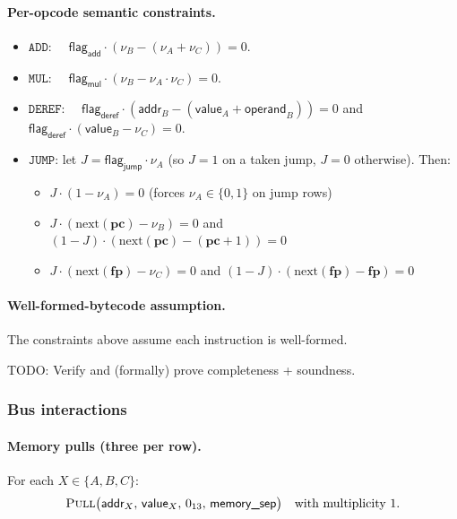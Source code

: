 \documentclass{article}
\theoremstyle{definition}
\begin{document}
\paragraph{Per-opcode semantic constraints.}
\begin{itemize}
    \item $\texttt{ADD}$: $\quad \textsf{flag}_\textsf{add} \cdot (\nu_B - (\nu_A + \nu_C)) = 0$.
    \item $\texttt{MUL}$: $\quad \textsf{flag}_\textsf{mul} \cdot (\nu_B - \nu_A \cdot \nu_C) = 0$.
    \item $\texttt{DEREF}$: $\quad \textsf{flag}_\textsf{deref} \cdot (\textsf{addr}_B - (\textsf{value}_A + \textsf{operand}_B)) = 0$ \quad and \quad $\textsf{flag}_\textsf{deref} \cdot (\textsf{value}_B - \nu_C) = 0$.
    \item $\texttt{JUMP}$: let $J = \textsf{flag}_\textsf{jump} \cdot \nu_A$ (so $J = 1$ on a taken jump, $J = 0$ otherwise). Then:
    \begin{itemize}
        \item $J \cdot (1 - \nu_A) = 0$ \quad (forces $\nu_A \in \{0, 1\}$ on jump rows)
        \item $J \cdot (\text{next}(\textbf{pc}) - \nu_B) = 0$ \quad and \quad $(1 - J) \cdot (\text{next}(\textbf{pc}) - (\textbf{pc} + 1)) = 0$
        \item $J \cdot (\text{next}(\textbf{fp}) - \nu_C) = 0$ \quad and \quad $(1 - J) \cdot (\text{next}(\textbf{fp}) - \textbf{fp}) = 0$
    \end{itemize}
\end{itemize}

\paragraph{Well-formed-bytecode assumption.} The constraints above assume each instruction is well-formed.

TODO: Verify and (formally) prove completeness + soundness.

\subsubsection{Bus interactions}\label{sec:execution-bus}

\paragraph{Memory pulls (three per row).} For each $X \in \{A, B, C\}$:
\[
\textsc{Pull}\big(\textsf{addr}_X,\, \textsf{value}_X,\, 0_{13},\, \textsf{memory\_sep}\big) \quad \text{with multiplicity } 1.
\]
\end{document}
